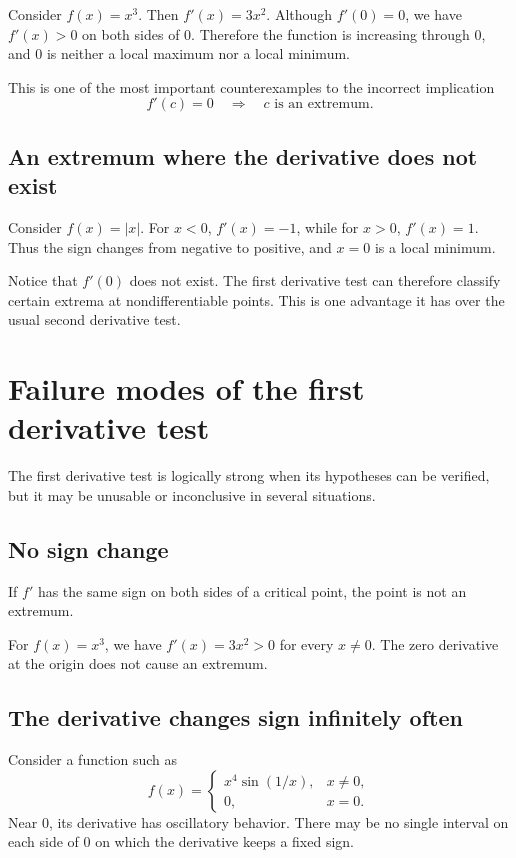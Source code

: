 \documentclass{essay}
\begin{document}
Consider \(f(x)=x^3\). Then \(f'(x)=3x^2\). Although \(f'(0)=0\), we have \(f'(x)>0\) on both sides of \(0\). Therefore the function is increasing through \(0\), and \(0\) is neither a local maximum nor a local minimum.

This is one of the most important counterexamples to the incorrect implication
\[
f'(c)=0
\quad\Longrightarrow\quad
\text{\(c\) is an extremum}.
\]

\subsection{An extremum where the derivative does not exist}

Consider \(f(x)=|x|\). For \(x<0\), \(f'(x)=-1\), while for \(x>0\), \(f'(x)=1\).
Thus the sign changes from negative to positive, and \(x=0\) is a local minimum.

Notice that \(f'(0)\) does not exist. The first derivative test can therefore classify certain extrema at nondifferentiable points. This is one advantage it has over the usual second derivative test.

\section{Failure modes of the first derivative test}

The first derivative test is logically strong when its hypotheses can be verified, but it may be unusable or inconclusive in several situations.

\subsection{No sign change}

If \(f'\) has the same sign on both sides of a critical point, the point is not an extremum.

For \(f(x)=x^3\), we have \(f'(x)=3x^2>0\) for every \(x\neq0\). The zero derivative at the origin does not cause an extremum.

\subsection{The derivative changes sign infinitely often}

Consider a function such as
\[
f(x)=
\begin{cases}
x^4\sin(1/x), & x\neq0,\\
0, & x=0.
\end{cases}
\]
Near \(0\), its derivative has oscillatory behavior. There may be no single interval on each side of \(0\) on which the derivative keeps a fixed sign.
\end{document}
